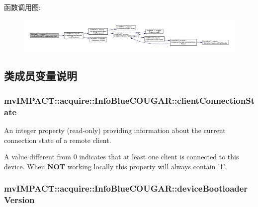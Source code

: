 函数调用图\+:
\nopagebreak
\begin{figure}[H]
\begin{center}
\leavevmode
\includegraphics[width=350pt]{classmv_i_m_p_a_c_t_1_1acquire_1_1_info_blue_c_o_u_g_a_r_a9811aaf42274ffec10fedec50cb7b3cd_cgraph}
\end{center}
\end{figure}




\subsection{类成员变量说明}
\hypertarget{classmv_i_m_p_a_c_t_1_1acquire_1_1_info_blue_c_o_u_g_a_r_a295b76c275788a9bd5f3c005b7606ff1}{
\subsubsection[{client\+Connection\+State}]{ mv\+I\+M\+P\+A\+C\+T\+::acquire\+::\+Info\+Blue\+C\+O\+U\+G\+A\+R\+::client\+Connection\+State}}\label{classmv_i_m_p_a_c_t_1_1acquire_1_1_info_blue_c_o_u_g_a_r_a295b76c275788a9bd5f3c005b7606ff1}


An integer property {\bfseries }(read-\/only) providing information about the current connection state of a remote client. 

A value different from 0 indicates that at least one client is connected to this device. When {\bfseries N\+O\+T} working locally this property will always contain '1'. \hypertarget{classmv_i_m_p_a_c_t_1_1acquire_1_1_info_blue_c_o_u_g_a_r_a5f15cc2b4482e0d993ca94e53c09ffc9}{
\subsubsection[{device\+Bootloader\+Version}]{ mv\+I\+M\+P\+A\+C\+T\+::acquire\+::\+Info\+Blue\+C\+O\+U\+G\+A\+R\+::device\+Bootloader\+Version}}\label{classmv_i_m_p_a_c_t_1_1acquire_1_1_info_blue_c_o_u_g_a_r_a5f15cc2b4482e0d993ca94e53c09ffc9}



